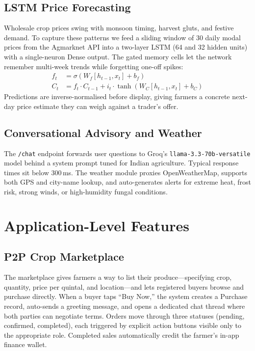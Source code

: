 \documentclass[conference]{IEEEtran}
\begin{document}
\subsection{LSTM Price Forecasting}
Wholesale crop prices swing with monsoon timing, harvest gluts,
and festive demand. To capture these patterns we feed a sliding window of 30 daily modal prices from
the Agmarknet API into a two-layer LSTM (64 and 32 hidden units) with a single-neuron Dense output.
The gated memory cells let the network remember multi-week trends while forgetting one-off spikes:
\begin{align}
f_t &= \sigma(W_f[h_{t-1},x_t]+b_f)\\
C_t &= f_t\cdot C_{t-1} + i_t\cdot\tanh(W_C[h_{t-1},x_t]+b_C)
\end{align}
Predictions are inverse-normalised before display, giving farmers a concrete next-day price estimate
they can weigh against a trader's offer.

\subsection{Conversational Advisory and Weather}
The \texttt{/chat} endpoint forwards user questions
to Groq's \texttt{llama-3.3-70b-versatile} model behind a system prompt tuned for Indian
agriculture. Typical response times sit below 300\,ms. The weather module proxies OpenWeatherMap,
supports both GPS and city-name lookup, and auto-generates alerts for extreme heat, frost risk,
strong winds, or high-humidity fungal conditions.

\section{Application-Level Features}

\subsection{P2P Crop Marketplace}
The marketplace gives farmers a way to list their
produce---specifying crop, quantity, price per quintal, and location---and lets registered buyers
browse and purchase directly. When a buyer taps ``Buy Now,'' the system creates a Purchase record,
auto-sends a greeting message, and opens a dedicated chat thread where both parties can negotiate
terms. Orders move through three statuses (pending, confirmed, completed), each triggered by
explicit action buttons visible only to the appropriate role. Completed sales automatically credit
the farmer's in-app finance wallet.
\end{document}
